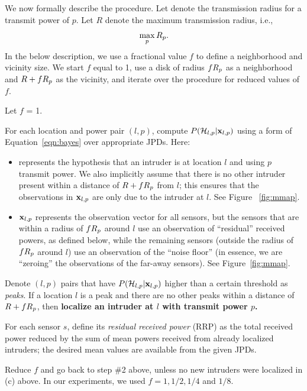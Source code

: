 We now formally describe the procedure.  Let \Rp denote the
transmission radius for a transmit power of $p$. Let $R$ denote the
maximum transmission radius, i.e., $$\max_p R_p.$$ In the below
description, we use a fractional value $f$ to define a neighborhood
and vicinity size. We start $f$ equal to 1, use a disk of radius
$fR_p$ as a neighborhood and $R + fR_p$ as the vicinity, and iterate
over the procedure for reduced values of $f$.
\begin{packedalpha}
	\item
	Let $f$ = 1.
	
	\item
	For each location and power pair $(l,p)$, compute $P(\mathcal{H}_{l,p} |
        \mathbf{x}_{l,p})$ using a form of Equation~\ref{eqn:bayes} over
        appropriate JPDs. Here:
        \begin{itemize}
          \item
         \hlp represents the hypothesis that an intruder is at
         location $l$ and using $p$ transmit power. We also implicitly
         assume that there is no other intruder present within a
         distance of $R + fR_p$ from $l$; this ensures that the
         observations in $\mathbf{x}_{l,p}$ are only due to the intruder at $l$.
         See Figure ~\ref{fig:mmap}.
         
       \item
         $\mathbf{x}_{l,p}$ represents the observation vector for all sensors,
         but the sensors that are within a radius of $fR_p$ around
         $l$ use an observation of ``residual'' received powers, as
         defined below, while the remaining sensors (outside the
         radius of $fR_p$ around $l$) use an observation of the
         ``noise floor'' (in essence, we are ``zeroing'' the
         observations of the far-away sensors). See Figure~\ref{fig:mmap}.
         \end{itemize}
	
	\item
	Denote $(l,p)$ pairs that have $P(\mathcal{H}_{l,p} | \mathbf{x}_{l,p})$ higher than a
        certain threshold as {\em peaks}. If a location $l$ is a peak
        and there are no other peaks within a distance of $R + fR_p$,
        then {\bf localize an intruder at $l$ with transmit power
          $p$.}

      \item
	For each sensor $s$, define its {\em residual received power}
          (RRP) as the total received power reduced by the sum of
        mean powers received from already localized intruders; the
        desired mean values are available from the given
        JPDs.
	
	\item
	Reduce $f$ and go back to step \#2 above, unless no new
        intruders were localized in (c) above. In our experiments, we
        used $f = 1, 1/2, 1/4$ and $1/8$.
\end{packedalpha}

